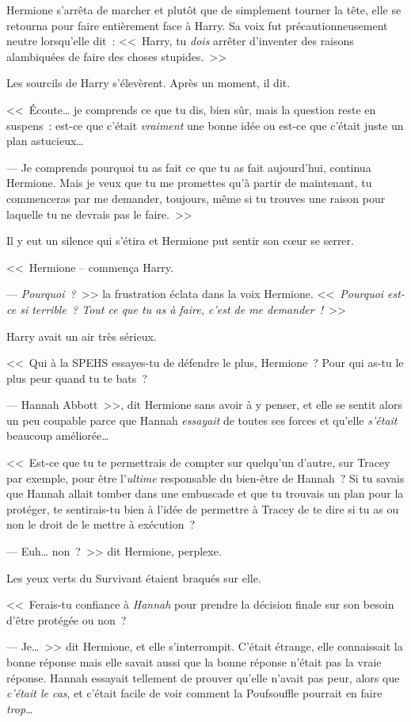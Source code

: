 Hermione s'arrêta de marcher et plutôt que de simplement tourner la tête, elle se retourna pour faire entièrement face à Harry. Sa voix fut précautionneusement neutre lorsqu'elle dit~: <<~Harry, tu \emph{dois} arrêter d'inventer des raisons alambiquées de faire des choses stupides.~>>

Les sourcils de Harry s'élevèrent. Après un moment, il dit.

<<~Écoute… je comprends ce que tu dis, bien sûr, mais la question reste en suspens~: est-ce que c'était \emph{vraiment} une bonne idée ou est-ce que c'était juste un plan astucieux…

--- Je comprends pourquoi tu as fait ce que tu as fait aujourd'hui, continua Hermione. Mais je veux que tu me promettes qu'à partir de maintenant, tu commenceras par me demander, toujours, même si tu trouves une raison pour laquelle tu ne devrais pas le faire.~>>

Il y eut un silence qui s'étira et Hermione put sentir son cœur se serrer.

<<~Hermione -- commença Harry.

--- \emph{Pourquoi~?}~>> la frustration éclata dans la voix Hermione. <<~\emph{Pourquoi est-ce si terrible~? Tout ce que tu as à faire, c'est de me demander~!}~>>

Harry avait un air très sérieux.

<<~Qui à la SPEHS essayes-tu de défendre le plus, Hermione~? Pour qui as-tu le plus peur quand tu te bats~?

--- Hannah Abbott~>>, dit Hermione sans avoir à y penser, et elle se sentit alors un peu coupable parce que Hannah \emph{essayait} de toutes ses forces et qu'elle \emph{s'était} beaucoup améliorée…

<<~Est-ce que tu te permettrais de compter sur quelqu'un d'autre, sur Tracey par exemple, pour être l'\emph{ultime} responsable du bien-être de Hannah~? Si tu savais que Hannah allait tomber dans une embuscade et que tu trouvais un plan pour la protéger, te sentirais-tu bien à l'idée de permettre à Tracey de te dire si tu as ou non le droit de le mettre à exécution~?

--- Euh… non~?~>> dit Hermione, perplexe.

Les yeux verts du Survivant étaient braqués sur elle.

<<~Ferais-tu confiance à \emph{Hannah} pour prendre la décision finale sur son besoin d'être protégée ou non~?

--- Je…~>> dit Hermione, et elle s'interrompit. C'était étrange, elle connaissait la bonne réponse mais elle savait aussi que la bonne réponse n'était pas la vraie réponse. Hannah essayait tellement de prouver qu'elle n'avait pas peur, alors que \emph{c'était le cas}, et c'était facile de voir comment la Poufsouffle pourrait en faire \emph{trop}…

